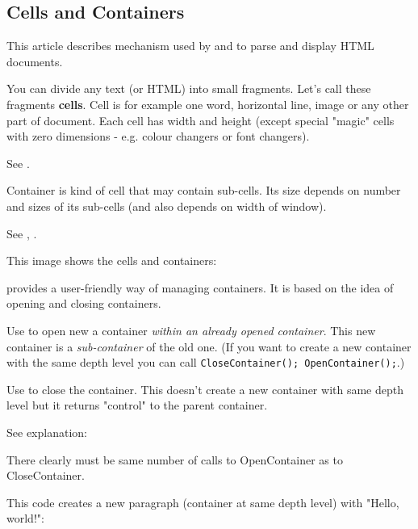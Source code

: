 \subsection{Cells and Containers}\label{cells}

This article describes mechanism used by 
 and 
 to parse and display HTML documents.


You can divide any text (or HTML) into small fragments. Let's call these
fragments {\bf cells}. Cell is for example one word, horizontal line, image
or any other part of document. Each cell has width and height (except special
"magic" cells with zero dimensions - e.g. colour changers or font changers).

See .


Container is kind of cell that may contain sub-cells. Its size depends
on number and sizes of its sub-cells (and also depends on width of window). 

See , 
.

This image shows the cells and containers:


 provides a user-friendly way
of managing containers. It is based on the idea of opening and closing containers.

Use  to open new
a container {\it within an already opened container}. This new container is a 
{\it sub-container} of the old one. (If you want to create a new container with
the same depth level you can call {\tt CloseContainer(); OpenContainer();}.)

Use  to close the 
container. This doesn't create a new container with same depth level but
it returns "control" to the parent container.

See explanation:

There clearly must be same number of calls to OpenContainer as to
CloseContainer.


This code creates a new paragraph (container at same depth level)
with "Hello, world!":

